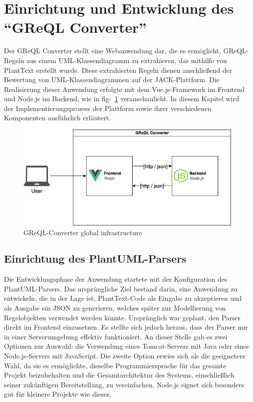 \section{Einrichtung und Entwicklung des ``GReQL Converter''}\label{sec:greql-converter}

Der GReQL Converter stellt eine Webanwendung dar, die es ermöglicht, GReQL-Regeln aus einem UML-Klassendiagramm zu
extrahieren, das mithilfe von PlantText erstellt wurde. Diese extrahierten Regeln dienen anschließend der Bewertung
von UML-Klassendiagrammen auf der JACK-Plattform. Die Realisierung dieser Anwendung erfolgte mit dem Vue.js-Framework
im Frontend und Node.js im Backend, wie in fig-~\ref{fig:infrastructure} veranschaulicht. In diesem Kapitel wird der
Implementierungsprozess der Plattform sowie ihrer verschiedenen Komponenten ausführlich erläutert.

\begin{figure}[h]
    \centering
    \includegraphics[width=15cm]{images/infrastucture}
    \caption{GReQL-Converter global infrastructure}
    \label{fig:infrastructure}
\end{figure}

\subsection{Einrichtung des PlantUML-Parsers}\label{subsec:einrichtung-des-plantuml-parsers}

Die Entwicklungsphase der Anwendung startete mit der Konfiguration des PlantUML-Parsers. Das ursprüngliche Ziel bestand
darin, eine Anwendung zu entwickeln, die in der Lage ist, PlantText-Code als Eingabe zu akzeptieren und als Ausgabe ein
JSON zu generieren, welches später zur Modellierung von Regelobjekten verwendet werden könnte. Ursprünglich war geplant,
den Parser direkt im Frontend einzusetzen. Es stellte sich jedoch heraus, dass der Parser nur in einer Serverumgebung
effektiv funktioniert. An dieser Stelle gab es zwei Optionen zur Auswahl: die Verwendung eines Tomcat-Servers mit Java
oder eines Node.js-Servers mit JavaScript. Die zweite Option erwies sich als die geeignetere Wahl, da sie es ermöglichte,
dieselbe Programmiersprache für das gesamte Projekt beizubehalten und die Gesamtarchitektur des Systems, einschließlich
seiner zukünftigen Bereitstellung, zu vereinfachen. Node.js eignet sich besonders gut für kleinere Projekte wie dieses.

